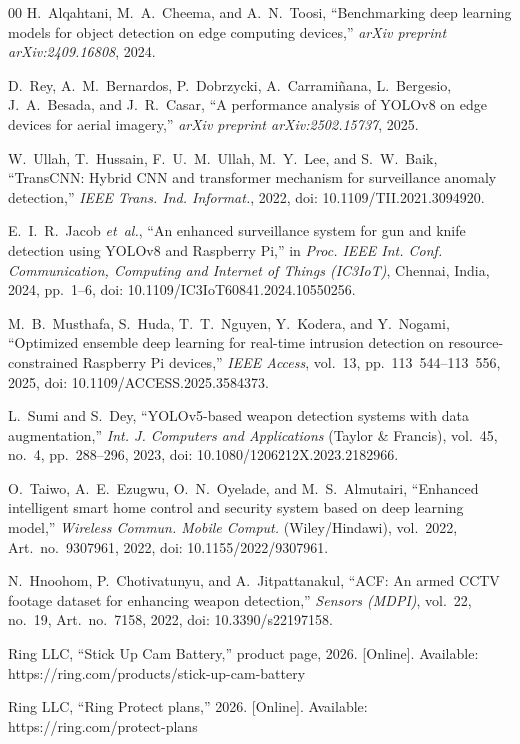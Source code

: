 \documentclass{ieeeaccess}
\begin{document}
\begin{thebibliography}{00}
 H.~Alqahtani, M.~A.~Cheema, and A.~N.~Toosi, ``Benchmarking deep learning models for object detection on edge computing devices,'' \emph{arXiv preprint arXiv:2409.16808}, 2024.

 D.~Rey, A.~M.~Bernardos, P.~Dobrzycki, A.~Carrami\~{n}ana, L.~Bergesio, J.~A.~Besada, and J.~R.~Casar, ``A performance analysis of YOLOv8 on edge devices for aerial imagery,'' \emph{arXiv preprint arXiv:2502.15737}, 2025.

 W.~Ullah, T.~Hussain, F.~U.~M.~Ullah, M.~Y.~Lee, and S.~W.~Baik, ``TransCNN: Hybrid CNN and transformer mechanism for surveillance anomaly detection,'' \emph{IEEE Trans. Ind. Informat.}, 2022, doi: 10.1109/TII.2021.3094920.

 E.~I.~R.~Jacob \emph{et~al.}, ``An enhanced surveillance system for gun and knife detection using YOLOv8 and Raspberry Pi,'' in \emph{Proc. IEEE Int. Conf. Communication, Computing and Internet of Things (IC3IoT)}, Chennai, India, 2024, pp.~1--6, doi: 10.1109/IC3IoT60841.2024.10550256.

 M.~B.~Musthafa, S.~Huda, T.~T.~Nguyen, Y.~Kodera, and Y.~Nogami, ``Optimized ensemble deep learning for real-time intrusion detection on resource-constrained Raspberry Pi devices,'' \emph{IEEE Access}, vol.~13, pp.~113~544--113~556, 2025, doi: 10.1109/ACCESS.2025.3584373.

 L.~Sumi and S.~Dey, ``YOLOv5-based weapon detection systems with data augmentation,'' \emph{Int. J. Computers and Applications} (Taylor \& Francis), vol.~45, no.~4, pp.~288--296, 2023, doi: 10.1080/1206212X.2023.2182966.

 O.~Taiwo, A.~E.~Ezugwu, O.~N.~Oyelade, and M.~S.~Almutairi, ``Enhanced intelligent smart home control and security system based on deep learning model,'' \emph{Wireless Commun. Mobile Comput.} (Wiley/Hindawi), vol.~2022, Art.~no.~9307961, 2022, doi: 10.1155/2022/9307961.

 N.~Hnoohom, P.~Chotivatunyu, and A.~Jitpattanakul, ``ACF: An armed CCTV footage dataset for enhancing weapon detection,'' \emph{Sensors (MDPI)}, vol.~22, no.~19, Art.~no.~7158, 2022, doi: 10.3390/s22197158.

 Ring LLC, ``Stick Up Cam Battery,'' product page, 2026. [Online]. Available: https://ring.com/products/stick-up-cam-battery

 Ring LLC, ``Ring Protect plans,'' 2026. [Online]. Available: https://ring.com/protect-plans


\end{thebibliography}
\end{document}
